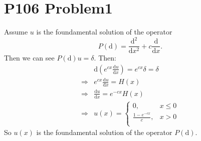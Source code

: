 \documentclass[a4paper]{ctexart}
\newcommand{\dif}{\mathrm{d}}
\newcommand{\difFrac}[2]{\frac{\dif #1}{\dif #2}}
\begin{document}
\section*{P106 Problem1}
Assume $u$ is the foundamental solution of the operator 
\begin{equation}
    \label{eq:DifOp}
    P(\mathrm{d})=\difFrac{^2}{x^2}+c\difFrac{}{x}.
\end{equation}
Then we can see $P(\mathrm{d})u=\delta$. Then:
\begin{equation}
    \label{eq:Foundamental}
    \begin{aligned}
        &\mathrm{d}(e^{cx}\difFrac{u}{x})=e^{cx}\delta=\delta\\
        \Rightarrow&e^{cx}\difFrac{u}{x}=H(x)\\
        \Rightarrow&\difFrac{u}{x}=e^{-cx}H(x)\\
        \Rightarrow&u(x)=\left\{
            \begin{aligned}
                0,&x\le 0\\
                \frac{1-e^{-cx}}{c},&x>0\\
            \end{aligned}
        \right.
    \end{aligned}
\end{equation}
So $u(x)$ is the foundamental solution of the operator $P(\mathrm{d})$.
\end{document}
